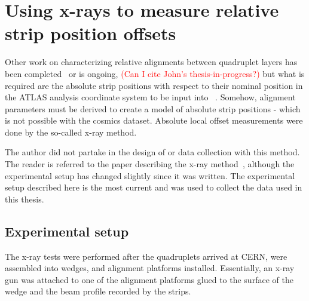 
\chapter{Using x-rays to measure relative strip position offsets}
\label{chap:xray}


Other work on characterizing relative alignments between quadruplet layers has been completed~\cite{zhao_cosmic_2019} or is ongoing, \textcolor{red}{(Can I cite John's thesis-in-progress?)} but what is required are the absolute strip positions with respect to their nominal position in the ATLAS analysis coordinate system to be input into ~\cite{the_atlas_collaboration_athena}. Somehow, alignment parameters must be derived to create a model of absolute strip positions - which is not possible with the cosmics dataset. Absolute local offset measurements were done by the so-called x-ray method. 

The author did not partake in the design of or data collection with this method. The reader is referred to the paper describing the x-ray method~\cite{lefebvre_precision_2020}, although the experimental setup has changed slightly since it was written. The experimental setup described here is the most current and was used to collect the data used in this thesis.

\section{Experimental setup}

The x-ray tests were performed after the quadruplets arrived at CERN, were assembled into wedges, and alignment platforms installed. Essentially, an x-ray gun was attached to one of the alignment platforms glued to the surface of the wedge and the beam profile recorded by the strips.

